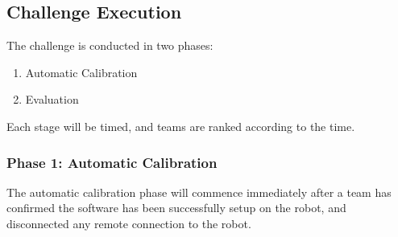 \subsection{Challenge Execution}

The challenge is conducted in two phases:
\begin{enumerate}
    \item Automatic Calibration
    \item Evaluation
\end{enumerate}

Each stage will be timed, and teams are ranked according to the time.

\subsubsection{Phase 1: Automatic Calibration}

The automatic calibration phase will commence immediately after a team has confirmed the software has been successfully setup on the robot, and disconnected any remote connection to the robot.

